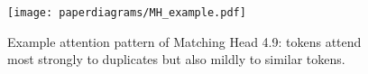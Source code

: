 \begin{figure}[!ht]
    \centering
    \texttt{[image: paperdiagrams/MH\_example.pdf]}
    \caption{Example attention pattern of Matching Head 4.9: tokens attend most strongly to duplicates but also mildly to similar tokens.}
    \label{fig:MH_example}
    \vspace{-0.75em}
\end{figure}